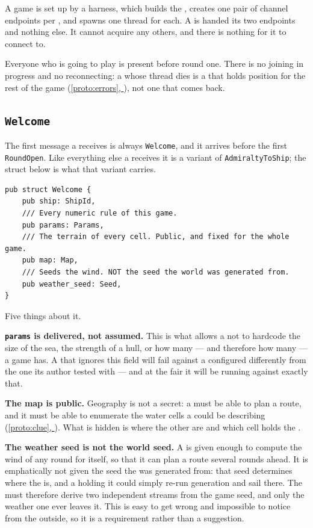 \documentclass{article}
\newcommand{\fullref}[1]{\hyperref[#1]{\cref*{#1}, \nameref*{#1}}}
\begin{document}
A game is set up by a harness, which builds the \chart, creates one pair of channel endpoints per
\ship, and spawns one thread for each. A \ship{} is handed its two endpoints and nothing else. It
cannot acquire any others, and there is nothing for it to connect to.

Everyone who is going to play is present before round one. There is no joining in progress and no
reconnecting: a \ship{} whose thread dies is a \ship{} that holds position for the rest of the game
(\fullref{proto:errors}), not one that comes back.

\subsection{\texttt{Welcome}}

The first message a \ship{} receives is always \texttt{Welcome}, and it arrives before the first
\texttt{RoundOpen}. Like everything else a \ship{} receives it is a variant of
\texttt{AdmiraltyToShip}; the struct below is what that variant carries.

\begin{lstlisting}
pub struct Welcome {
    pub ship: ShipId,
    /// Every numeric rule of this game.
    pub params: Params,
    /// The terrain of every cell. Public, and fixed for the whole game.
    pub map: Map,
    /// Seeds the wind. NOT the seed the world was generated from.
    pub weather_seed: Seed,
}
\end{lstlisting}

Five things about it.

\textbf{\texttt{params} is delivered, not assumed.} This is what allows a \ship{} not to hardcode
the size of the sea, the strength of a hull, or how many \islands{} --- and therefore how many
\clues{} --- a game has. A \ship{} that
ignores this field will fail against a \chart{} configured differently from the one its author
tested with --- and at the fair it will be running against exactly that.

\textbf{The map is public.} Geography is not a secret: a \ship{} must be able to plan a route, and
it must be able to enumerate the water cells a \clue{} could be describing (\fullref{proto:clue}).
What is hidden is where the other \ships are and which cell holds the \treasure{}.

\textbf{The weather seed is not the world seed.} A \ship{} is given enough to compute the wind of
any round for itself, so that it can plan a route several rounds ahead. It is emphatically not given
the seed the \archipelago{} was generated from: that seed determines where the \treasure{} is, and a
\ship{} holding it could simply re-run generation and sail there. The \chart{} must therefore derive
two independent streams from the game seed, and only the weather one ever leaves it. This is easy to
get wrong and impossible to notice from the outside, so it is a requirement rather than a
suggestion.
\end{document}
